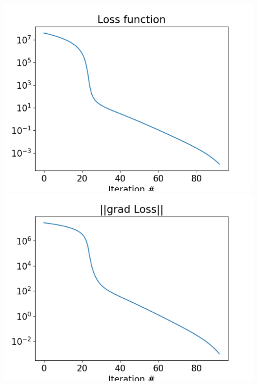 \documentclass{article}
\begin{document}
\begin{center}
	\includegraphics[scale=.5]{task2 loss}
	\includegraphics[scale=.5]{task2 gradnorm}
\end{center}

	
\end{document}
